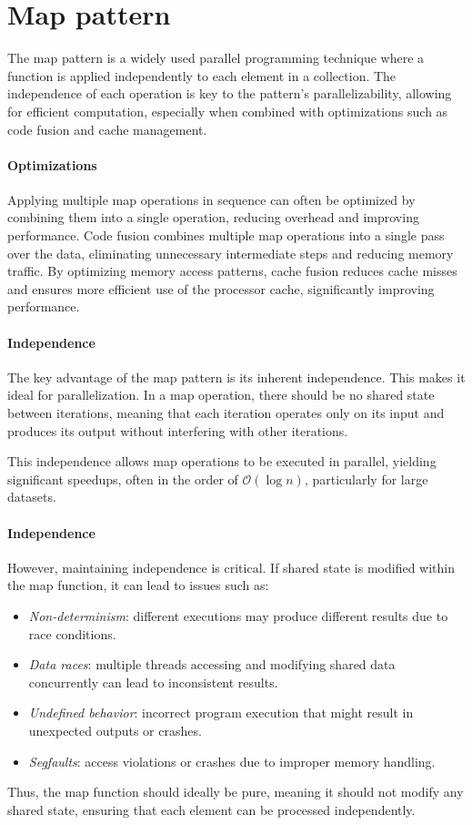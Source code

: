 \section{Map pattern}

The map pattern is a widely used parallel programming technique where a function is applied independently to each element in a collection. 
The independence of each operation is key to the pattern's parallelizability, allowing for efficient computation, especially when combined with optimizations such as code fusion and cache management.

\paragraph*{Optimizations}
Applying multiple map operations in sequence can often be optimized by combining them into a single operation, reducing overhead and improving performance.
Code fusion combines multiple map operations into a single pass over the data, eliminating unnecessary intermediate steps and reducing memory traffic.
By optimizing memory access patterns, cache fusion reduces cache misses and ensures more efficient use of the processor cache, significantly improving performance.

\paragraph*{Independence}
The key advantage of the map pattern is its inherent independence. 
This makes it ideal for parallelization. 
In a map operation, there should be no shared state between iterations, meaning that each iteration operates only on its input and produces its output without interfering with other iterations.

This independence allows map operations to be executed in parallel, yielding significant speedups, often in the order of $\mathcal{O}(\log n)$, particularly for large datasets.

\paragraph*{Independence}
However, maintaining independence is critical. If shared state is modified within the map function, it can lead to issues such as:
\begin{itemize} 
    \item \textit{Non-determinism}: different executions may produce different results due to race conditions. 
    \item \textit{Data races}: multiple threads accessing and modifying shared data concurrently can lead to inconsistent results. 
    \item \textit{Undefined behavior}: incorrect program execution that might result in unexpected outputs or crashes. 
    \item \textit{Segfaults}: access violations or crashes due to improper memory handling. 
\end{itemize}
Thus, the map function should ideally be pure, meaning it should not modify any shared state, ensuring that each element can be processed independently.

